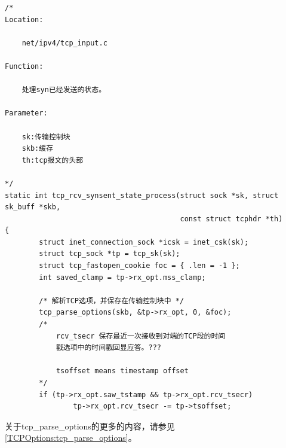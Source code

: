 \begin{verbatim}
/*
Location:

    net/ipv4/tcp_input.c

Function:

    处理syn已经发送的状态。

Parameter:

    sk:传输控制块
    skb:缓存
    th:tcp报文的头部

*/
static int tcp_rcv_synsent_state_process(struct sock *sk, struct sk_buff *skb,
                                         const struct tcphdr *th)
{
        struct inet_connection_sock *icsk = inet_csk(sk);
        struct tcp_sock *tp = tcp_sk(sk);
        struct tcp_fastopen_cookie foc = { .len = -1 };
        int saved_clamp = tp->rx_opt.mss_clamp;

        /* 解析TCP选项，并保存在传输控制块中 */
        tcp_parse_options(skb, &tp->rx_opt, 0, &foc);
        /*
            rcv_tsecr 保存最近一次接收到对端的TCP段的时间
            戳选项中的时间戳回显应答。???

            tsoffset means timestamp offset
        */
        if (tp->rx_opt.saw_tstamp && tp->rx_opt.rcv_tsecr)
                tp->rx_opt.rcv_tsecr -= tp->tsoffset;
\end{verbatim}

        关于tcp\_parse\_options的更多的内容，请参见\ref{TCPOptions:tcp_parse_options}。

